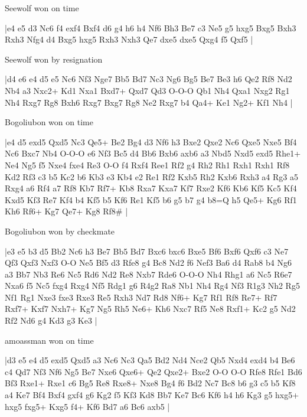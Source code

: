 \showboard

Seewolf won on time

\makegametitle
|e4 e5 d3 Nc6 f4 exf4 Bxf4 d6 g4 h6 h4 Nf6 Bh3 Be7 c3 Ne5 g5 hxg5 Bxg5 Bxh3 Rxh3 Nfg4 d4 Bxg5 hxg5 Rxh3 Nxh3 Qe7 dxe5 dxe5 Qxg4 f5 Qxf5  |

\showboard

Seewolf won by resignation

\makegametitle
|d4 e6 e4 d5 e5 Nc6 Nf3 Nge7 Bb5 Bd7 Nc3 Ng6 Bg5 Be7 Be3 h6 Qe2 Rf8 Nd2 Nb4 a3 Nxc2+ Kd1 Nxa1 Bxd7+ Qxd7 Qd3 O-O-O Qb1 Nh4 Qxa1 Nxg2 Rg1 Nh4 Rxg7 Rg8 Bxh6 Rxg7 Bxg7 Rg8 Ne2 Rxg7 b4 Qa4+ Ke1 Ng2+ Kf1 Nh4  |

\showboard

Bogoliubon won on time

\makegametitle
|e4 d5 exd5 Qxd5 Nc3 Qe5+ Be2 Bg4 d3 Nf6 h3 Bxe2 Qxe2 Nc6 Qxe5 Nxe5 Bf4 Nc6 Bxc7 Nb4 O-O-O e6 Nf3 Bc5 d4 Bb6 Bxb6 axb6 a3 Nbd5 Nxd5 exd5 Rhe1+ Ne4 Ng5 f5 Nxe4 fxe4 Re3 O-O f4 Rxf4 Ree1 Rf2 g4 Rh2 Rh1 Rxh1 Rxh1 Rf8 Kd2 Rf3 c3 b5 Kc2 b6 Kb3 e3 Kb4 e2 Re1 Rf2 Kxb5 Rh2 Kxb6 Rxh3 a4 Rg3 a5 Rxg4 a6 Rf4 a7 Rf8 Kb7 Rf7+ Kb8 Rxa7 Kxa7 Kf7 Rxe2 Kf6 Kb6 Kf5 Kc5 Kf4 Kxd5 Kf3 Re7 Kf4 b4 Kf5 b5 Kf6 Re1 Kf5 b6 g5 b7 g4 b8=Q h5 Qe5+ Kg6 Rf1 Kh6 Rf6+ Kg7 Qe7+ Kg8 Rf8\#  |

\showboard

Bogoliubon won by checkmate

\makegametitle
|e3 e5 b3 d5 Bb2 Nc6 h3 Be7 Bb5 Bd7 Bxc6 bxc6 Bxe5 Bf6 Bxf6 Qxf6 c3 Ne7 Qf3 Qxf3 Nxf3 O-O Ne5 Bf5 d3 Rfe8 g4 Bc8 Nd2 f6 Nef3 Ba6 d4 Rab8 b4 Ng6 a3 Bb7 Nb3 Re6 Nc5 Rd6 Nd2 Re8 Nxb7 Rde6 O-O-O Nh4 Rhg1 a6 Nc5 R6e7 Nxa6 f5 Nc5 fxg4 Rxg4 Nf5 Rdg1 g6 R4g2 Ra8 Nb1 Nh4 Rg4 Nf3 R1g3 Nh2 Rg5 Nf1 Rg1 Nxe3 fxe3 Rxe3 Re5 Rxh3 Nd7 Rd8 Nf6+ Kg7 Rf1 Rf8 Re7+ Rf7 Rxf7+ Kxf7 Nxh7+ Kg7 Ng5 Rh5 Ne6+ Kh6 Nxc7 Rf5 Ne8 Rxf1+ Kc2 g5 Nd2 Rf2 Nd6 g4 Kd3 g3 Ke3  |

\showboard

amoassman won on time

\makegametitle
|d3 e5 e4 d5 exd5 Qxd5 a3 Nc6 Nc3 Qa5 Bd2 Nd4 Nce2 Qb5 Nxd4 exd4 b4 Be6 c4 Qd7 Nf3 Nf6 Ng5 Be7 Nxe6 Qxe6+ Qe2 Qxe2+ Bxe2 O-O O-O Rfe8 Rfe1 Bd6 Bf3 Rxe1+ Rxe1 c6 Bg5 Re8 Rxe8+ Nxe8 Bg4 f6 Bd2 Nc7 Bc8 b6 g3 c5 b5 Kf8 a4 Ke7 Bf4 Bxf4 gxf4 g6 Kg2 f5 Kf3 Kd8 Bb7 Ke7 Bc6 Kf6 h4 h6 Kg3 g5 hxg5+ hxg5 fxg5+ Kxg5 f4+ Kf6 Bd7 a6 Bc6 axb5  |

